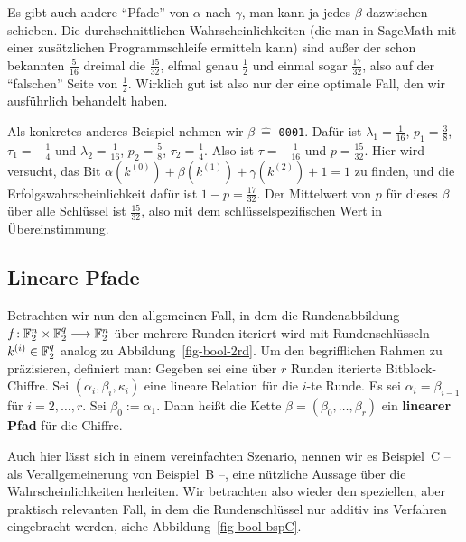 \begin{refsegment}
Es gibt auch andere "`Pfade"' von $\alpha$ nach $\gamma$, man kann ja jedes
$\beta$ dazwischen schieben. Die durchschnittlichen Wahrscheinlichkeiten
(die man in SageMath mit einer zusätzlichen Programmschleife ermitteln kann)
sind außer der schon bekannten $\frac{5}{16}$ dreimal die $\frac{15}{32}$,
elfmal genau $\frac{1}{2}$ und einmal sogar $\frac{17}{32}$, also auf der
"`falschen"' Seite von $\frac{1}{2}$. Wirklich gut ist also nur der eine
optimale Fall, den wir ausführlich behandelt haben.

Als konkretes anderes Beispiel nehmen
wir $\beta \:\hat{=}$ \verb:0001:. Dafür ist $\lambda_1 = \frac{1}{16}$,
$p_1 = \frac{3}{8}$, $\tau_1 = -\frac{1}{4}$ und
$\lambda_2 = \frac{1}{16}$, $p_2 = \frac{5}{8}$, $\tau_2 = \frac{1}{4}$.
Also ist $\tau = -\frac{1}{16}$ und $p = \frac{15}{32}$.
Hier wird versucht, das Bit $\alpha(k^{(0)}) + \beta(k^{(1)}) + \gamma(k^{(2)}) + 1 = 1$
zu finden, und die Erfolgswahrscheinlichkeit dafür ist $1 - p = \frac{17}{32}$.
Der Mittelwert von $p$ für dieses $\beta$
über alle Schlüssel ist $\frac{15}{32}$, also mit dem
schlüsselspezifischen Wert in Übereinstimmung.

\subsection{Lineare Pfade}\label{ss-bool-path}

Betrachten wir nun den allgemeinen Fall, in dem die Rundenabbildung
\mbox{$f\!: \mathbb{F}_2^n \times \mathbb{F}_2^q \longrightarrow \mathbb{F}_2^n$} über mehrere Runden
iteriert wird mit Rundenschlüsseln $k^{(i)} \in \mathbb{F}_2^q$
analog zu Abbildung~\ref{fig-bool-2rd}.
Um den begrifflichen Rahmen zu präzisieren, definiert man: Gegeben sei eine
über $r$ Runden iterierte Bitblock-Chiffre.
Sei $(\alpha_i,\beta_i,\kappa_i)$ eine lineare
Relation für die $i$-te
Runde. Es sei $\alpha_i = \beta_{i-1}$ für $i = 2, \ldots, r$. Sei
$\beta_0 := \alpha_1$. Dann heißt die Kette
$\beta = (\beta_0, \ldots, \beta_r)$ ein
\textbf{linearer Pfad} für die Chiffre.

Auch hier lässt sich in einem vereinfachten Szenario, nennen wir es
Beispiel~C -- als Verallgemeinerung von Beispiel~B --, eine nützliche
Aussage über die Wahrscheinlichkeiten herleiten. Wir betrachten also
wieder den speziellen, aber praktisch relevanten Fall, in dem die
Rundenschlüssel nur additiv ins Verfahren
eingebracht werden, siehe Abbildung~\ref{fig-bool-bspC}.


\end{refsegment}
